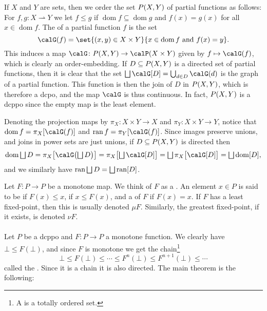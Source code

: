 \documentclass[a4paper, 11pt, article, danish, oneside]{memoir}
\DeclarePairedDelimiter{\auxdelimparen}{(}{)}
\DeclarePairedDelimiter{\auxdelimbracket}{[}{]}
\newcommand{\powerset}[2][]{\calP\auxdelimparen[#1]{#2}}
\DeclareMathOperator*{\smallbigsqcup}{\textstyle\bigsqcup}
\DeclareMathOperator*{\bigdjoin}{\mathchoice
    {\smallbigsqcup}%
    {\bigsqcup}%
    {\bigsqcup}%
    {\bigsqcup}%
}
\DeclareMathOperator*{\smallbigcup}{\textstyle\bigcup}
\DeclareMathOperator*{\bigunion}{\mathchoice
    {\smallbigcup}%
    {\bigcup}%
    {\bigcup}%
    {\bigcup}%
}
\newcommand{\image}[2][]{\auxdelimbracket[#1]{#2}}
\newcommand{\newpar}{\paragraph{}}
\newcommand{\pto}{\rightharpoonup}
\newcommand{\dom}{\operatorname{dom}}
\newcommand{\ran}{\operatorname{ran}}
\renewcommand{\prod}{\times}
\newcommand{\pmaps}[3][]{%
    \ifstrempty{#1}%
        {%
            P(#2,#3)
        }{%
            P_{#1}(#2,#3)
        }%
}
\begin{document}
\begin{examplebreak}
    If $X$ and $Y$ are sets, then we order the set $\pmaps{X}{Y}$ of partial functions as follows: For $f,g \colon X \pto Y$ we let $f \leq g$ if $\dom f \subseteq \dom g$ and $f(x) = g(x)$ for all $x \in \dom f$. The  of a partial function $f$ is the set
    \begin{equation*}
        \graph{f} = \set{(x,y) \in X \prod Y}{x \in \dom f \text{ and } f(x) = y}.
    \end{equation*}
    This induces a map $\calG \colon \pmaps{X}{Y} \to \powerset{X \prod Y}$ given by $f \mapsto \graph{f}$, which is clearly an order-embedding. If $D \subseteq \pmaps{X}{Y}$ is a directed set of partial functions, then it is clear that the set $\bigdjoin \calG\image{D} = \bigunion_{d \in D} \graph{d}$ is the graph of a partial function. This function is then the join of $D$ in $\pmaps{X}{Y}$, which is therefore a dcpo, and the map $\calG$ is thus continuous. In fact, $\pmaps{X}{Y}$ is a dcppo since the empty map is the least element.

    Denoting the projection maps by $\pi_X \colon X \prod Y \to X$ and $\pi_Y \colon X \prod Y \to Y$, notice that $\dom f = \pi_X\image{\graph{f}}$ and $\ran f = \pi_Y\image{\graph{f}}$. Since images preserve unions, and joins in power sets are just unions, if $D \subseteq \pmaps{X}{Y}$ is directed then
    \begin{equation*}
        \dom \bigdjoin D
            = \pi_X\image[\big]{\graph[\big]{\bigdjoin D}}
            = \pi_X\image[\big]{\bigdjoin \calG\image{D}}
            = \bigdjoin \pi_X\image[\big]{\calG\image{D}}
            = \bigdjoin \dom\image{D},
    \end{equation*}
    and we similarly have $\ran \bigdjoin D = \bigdjoin \ran\image{D}$.
\end{examplebreak}


Let $F \colon P \to P$ be a monotone map. We think of $F$ as a . An element $x \in P$ is said to be  if $F(x) \leq x$,  if $x \leq F(x)$, and a  of $F$ if $F(x) = x$. If $F$ has a least fixed-point, then this is usually denoted $\mu F$. Similarly, the greatest fixed-point, if it exists, is denoted $\nu F$.


\newpar

Let $P$ be a dcppo and $F \colon P \to P$ a monotone function. We clearly have $\bot \leq F(\bot)$, and since $F$ is monotone we get the chain\footnote{A  is a totally ordered set.}
%
\begin{equation*}
    \bot
        \leq F(\bot)
        \leq \cdots
        \leq F^n(\bot)
        \leq F^{n+1}(\bot)
        \leq \cdots
\end{equation*}
%
called the . Since it is a chain it is also directed. The main theorem is the following:
\end{document}
